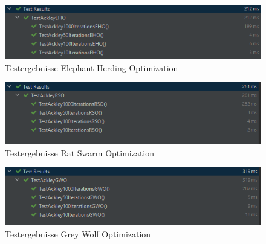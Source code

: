 \begin{figure}[ht]
    \begin{center}
        \includegraphics[width=.7\textwidth]{./assets/img/Test_eho.PNG}
        \caption{Testergebnisse Elephant Herding Optimization}
        \label{test_eho}
    \end{center}
\end{figure}
\begin{figure}[ht]
    \begin{center}
        \includegraphics[width=.7\textwidth]{./assets/img/Test_rso.PNG}
        \caption{Testergebnisse Rat Swarm Optimization} 
        \label{test_rso}
    \end{center}
\end{figure}
\begin{figure}[ht]
    \begin{center}
        \includegraphics[width=.7\textwidth]{./assets/img/Test_gwo.PNG}
        \caption{Testergebnisse Grey Wolf Optimization}
        \label{test_gwo}
    \end{center}
\end{figure}
